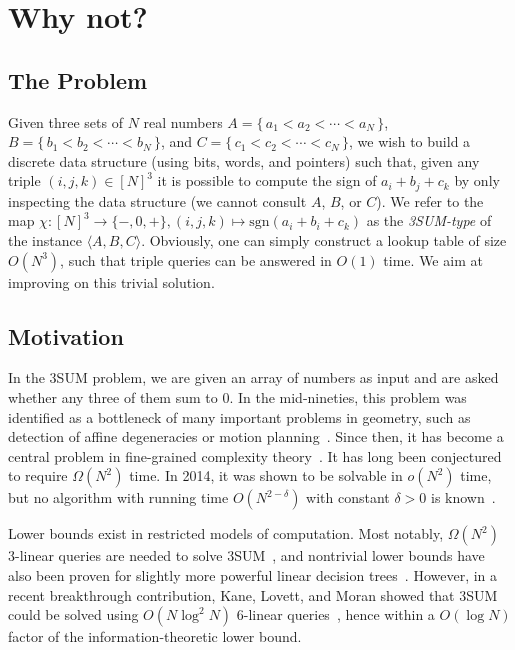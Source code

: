\section{Why not?}

\subsection{The Problem}

Given three sets of \(N\) real numbers
\(A = \{\, a_1 < a_2 < \cdots < a_N\,\} \),
\(B = \{\, b_1 < b_2 < \cdots < b_N\,\} \),
and \(C = \{\, c_1 < c_2 < \cdots < c_N\,\}\),
we wish to build a discrete data structure (using bits, words, and pointers) such that,
given any triple \((i,j,k) \in {[N]}^3\) it is possible to compute the sign of
\(a_i + b_j + c_k\) by only inspecting the data structure (we cannot consult
\(A\), \(B\), or \(C\)).
We refer to the map $\chi : {[N]}^3\to \{-,0,+\}, (i,j,k)\mapsto\mathrm{sgn}
(a_i+b_i+c_k)$ as the {\em 3SUM-type} of the instance $\langle A,B,C \rangle$.
Obviously, one can simply construct a lookup table of size \(O(N^3)\), such
that triple queries can be answered in \(O(1)\) time. We aim at improving on
this trivial solution.

\subsection{Motivation}

In the 3SUM problem, we are given an array of numbers as input and are asked
whether any three of them sum to 0. In the mid-nineties, this problem was
identified as a bottleneck of many
important problems in geometry, such as detection of affine degeneracies or
motion planning~\cite{GO95}. Since then, it has become a central problem in
fine-grained complexity theory~\cite{PW10}. It has long been conjectured to
require $\Omega (N^2)$ time. In 2014, it was shown to be solvable in $o(N^2)$
time, but no algorithm with running time $O(N^{2-\delta})$ with constant
$\delta>0$ is known~\cite{GP18}.

Lower bounds exist in restricted models of computation. Most notably,
$\Omega(N^2)$ 3-linear queries are needed to solve 3SUM~\cite{Er99a},
and nontrivial lower bounds have also been proven for slightly more powerful linear
decision trees~\cite{AC05}. However, in a recent breakthrough contribution, Kane, Lovett,
and Moran showed that 3SUM could be solved using $O(N\log^2 N)$
6-linear queries~\cite{KLM18}, hence within a $O(\log N)$ factor of the
information-theoretic lower bound.


